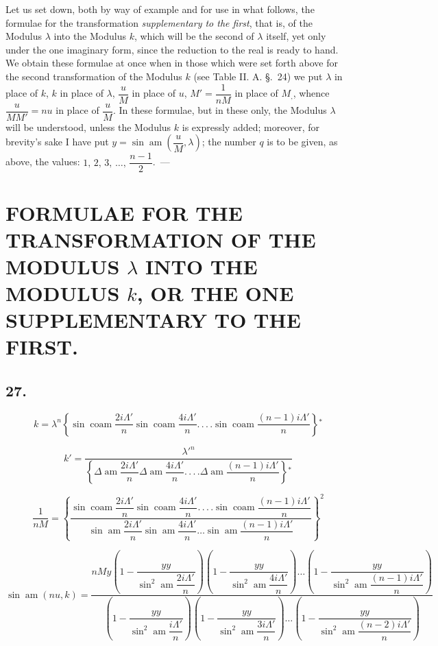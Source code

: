 \documentclass{article}
\begin{document}
Let us set down, both by way of example and for use in what follows, the formulae for the transformation \emph{supplementary to the first}, that is, of the Modulus $\lambda$ into the Modulus $k$, which will be the second of $\lambda$ itself, yet only under the one imaginary form, since the reduction to the real is ready to hand. We obtain these formulae at once when in those which were set forth above for the second transformation of the Modulus $k$ (see Table II. A. §.\ 24) we put $\lambda$ in place of $k$, $k$ in place of $\lambda$, $\dfrac{u}{M}$ in place of $u$, $M'=\dfrac{1}{nM}$ in place of $M_{,}$, whence $\dfrac{u}{MM'}=nu$ in place of $\dfrac{u}{M}$. In these formulae, but in these only, the Modulus $\lambda$ will be understood, unless the Modulus $k$ is expressly added; moreover, for brevity's sake I have put $y=\sin\operatorname{am}\left(\dfrac{u}{M},\lambda\right)$; the number $q$ is to be given, as above, the values: $1,\,2,\,3,\,\ldots,\,\dfrac{n-1}{2}$.\ ---

\section*{FORMULAE FOR THE TRANSFORMATION OF THE MODULUS $\lambda$ INTO THE MODULUS $k$, OR THE ONE SUPPLEMENTARY TO THE FIRST.}

\subsection*{27.}

\[
k=\lambda^{n}\left\{\sin\operatorname{coam}\frac{2i\Lambda'}{n}\sin\operatorname{coam}\frac{4i\Lambda'}{n}.\,.\,.\,.\sin\operatorname{coam}\frac{(n-1)i\Lambda'}{n}\right\}{}^{*}
\]

\[
k'=\frac{\lambda'^{n}}{\left\{\Delta\operatorname{am}\dfrac{2i\Lambda'}{n}\Delta\operatorname{am}\dfrac{4i\Lambda'}{n}.\,.\,.\,.\Delta\operatorname{am}\dfrac{(n-1)i\Lambda'}{n}\right\}{}^{*}}
\]

\[
\frac{1}{nM}=\left\{\frac{\sin\operatorname{coam}\dfrac{2i\Lambda'}{n}\sin\operatorname{coam}\dfrac{4i\Lambda'}{n}.\,.\,.\,.\sin\operatorname{coam}\dfrac{(n-1)i\Lambda'}{n}}{\sin\operatorname{am}\dfrac{2i\Lambda'}{n}\sin\operatorname{am}\dfrac{4i\Lambda'}{n}\ldots\sin\operatorname{am}\dfrac{(n-1)i\Lambda'}{n}}\right\}^{2}
\]

\[
\sin\operatorname{am}(nu,k)=\frac{nMy\left(1-\dfrac{yy}{\sin^{2}\operatorname{am}\dfrac{2i\Lambda'}{n}}\right)\left(1-\dfrac{yy}{\sin^{2}\operatorname{am}\dfrac{4i\Lambda'}{n}}\right)\ldots\left(1-\dfrac{yy}{\sin^{2}\operatorname{am}\dfrac{(n-1)i\Lambda'}{n}}\right)}{\left(1-\dfrac{yy}{\sin^{2}\operatorname{am}\dfrac{i\Lambda'}{n}}\right)\left(1-\dfrac{yy}{\sin^{2}\operatorname{am}\dfrac{3i\Lambda'}{n}}\right)\ldots\left(1-\dfrac{yy}{\sin^{2}\operatorname{am}\dfrac{(n-2)i\Lambda'}{n}}\right)}
\]
\end{document}
